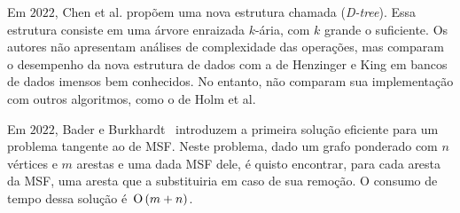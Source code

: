 
Em $2022$, Chen et al. \cite{QC22} propõem uma nova estrutura chamada  (\textit{D-tree}). Essa estrutura consiste em uma árvore enraizada $k$-ária, com $k$ grande o suficiente. Os autores não apresentam análises de complexidade das operações, mas comparam o desempenho da nova estrutura de dados com a de Henzinger e King em bancos de dados imensos bem conhecidos. No entanto, não comparam sua implementação com outros algoritmos, como o de Holm et al.

Em $2022$, Bader e Burkhardt~\cite{simpleAndEfficient2022} introduzem a primeira solução eficiente para um problema tangente ao de MSF. Neste problema, dado um grafo ponderado com $n$ vértices e $m$ arestas e uma dada MSF dele, é quisto encontrar, para cada aresta da MSF, uma aresta que a substituiria em caso de sua remoção. O consumo de tempo dessa solução é~$\text{O}\left(m+n\right)$.




